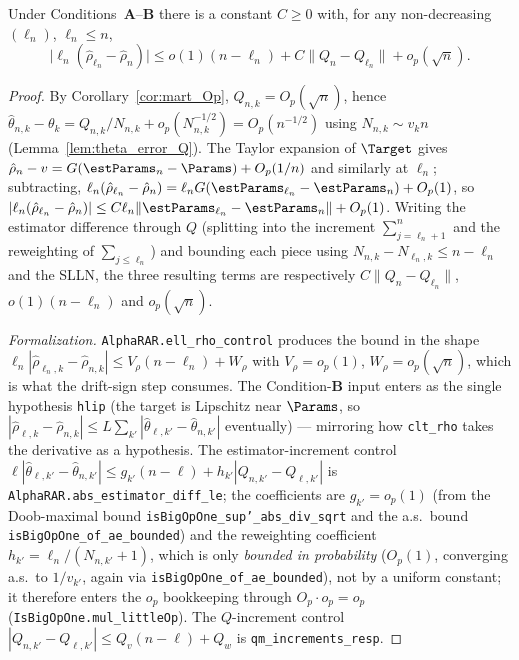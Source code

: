 \begin{lemma}\label{lem:ell_rho_control}
\leanok
{}
Under Conditions~\textbf{A}--\textbf{B} there is a constant $C\ge0$ with, for any
non-decreasing $(\ell_n)$, $\ell_n\le n$,
\[
  \big|\ell_n(\hat{\rho}_{\ell_n} - \hat{\rho}_n)\big|
  \le o(1)(n-\ell_n) + C\|Q_n - Q_{\ell_n}\| + o_p(\sqrt n).
\]
\end{lemma}

\begin{proof}\leanok
{}
By Corollary~\ref{cor:mart_Op}, $Q_{n,k}=O_p(\sqrt n)$, hence
$\hat{\theta}_{n,k}-\theta_k = Q_{n,k}/N_{n,k} + o_p(N_{n,k}^{-1/2}) = O_p(n^{-1/2})$
using $N_{n,k}\sim v_k n$ (Lemma~\ref{lem:theta_error_Q}). The Taylor expansion of
$\Target$ gives $\hat{\rho}_n - v = G(\estParams_n-\Params)+O_p(1/n)$ and similarly
at $\ell_n$; subtracting,
$\ell_n(\hat{\rho}_{\ell_n}-\hat{\rho}_n)
 = \ell_n G(\estParams_{\ell_n}-\estParams_n) + O_p(1)$, so
$|\ell_n(\hat{\rho}_{\ell_n}-\hat{\rho}_n)| \le C\ell_n\|\estParams_{\ell_n}-\estParams_n\| + O_p(1)$.
Writing the estimator difference through $Q$ (splitting into the increment
$\sum_{j=\ell_n+1}^n$ and the reweighting of $\sum_{j\le\ell_n}$) and bounding
each piece using $N_{n,k}-N_{\ell_n,k}\le n-\ell_n$ and the SLLN, the three
resulting terms are respectively $C\|Q_n-Q_{\ell_n}\|$, $o(1)(n-\ell_n)$ and
$o_p(\sqrt n)$.

\emph{Formalization.} \texttt{AlphaRAR.ell\_rho\_control} produces the bound in the shape
$\ell_n|\hat\rho_{\ell_n,k}-\hat\rho_{n,k}| \le V_\rho(n-\ell_n)+W_\rho$ with $V_\rho=o_p(1)$,
$W_\rho=o_p(\sqrt n)$, which is what the drift-sign step consumes. The Condition-\textbf{B} input
enters as the single hypothesis \texttt{hlip} (the target is Lipschitz near $\Params$, so
$|\hat\rho_{\ell,k}-\hat\rho_{n,k}|\le L\sum_{k'}|\hat\theta_{\ell,k'}-\hat\theta_{n,k'}|$
eventually) --- mirroring how \texttt{clt\_rho} takes the derivative as a hypothesis. The
estimator-increment control $\ell|\hat\theta_{\ell,k'}-\hat\theta_{n,k'}|\le g_{k'}(n-\ell)+h_{k'}
|Q_{n,k'}-Q_{\ell,k'}|$ is \texttt{AlphaRAR.abs\_estimator\_diff\_le}; the coefficients are
$g_{k'}=o_p(1)$ (from the Doob-maximal bound \texttt{isBigOpOne\_sup'\_abs\_div\_sqrt} and the a.s.\
bound \texttt{isBigOpOne\_of\_ae\_bounded}) and the reweighting coefficient
$h_{k'}=\ell_n/(N_{n,k'}+1)$, which is only \emph{bounded in probability} ($O_p(1)$, converging a.s.\
to $1/v_{k'}$, again via \texttt{isBigOpOne\_of\_ae\_bounded}), not by a uniform constant; it
therefore enters the $o_p$ bookkeeping through $O_p\cdot o_p=o_p$
(\texttt{IsBigOpOne.mul\_littleOp}). The $Q$-increment control
$|Q_{n,k'}-Q_{\ell,k'}|\le Q_v(n-\ell)+Q_w$ is \texttt{qm\_increments\_resp}.
\end{proof}

